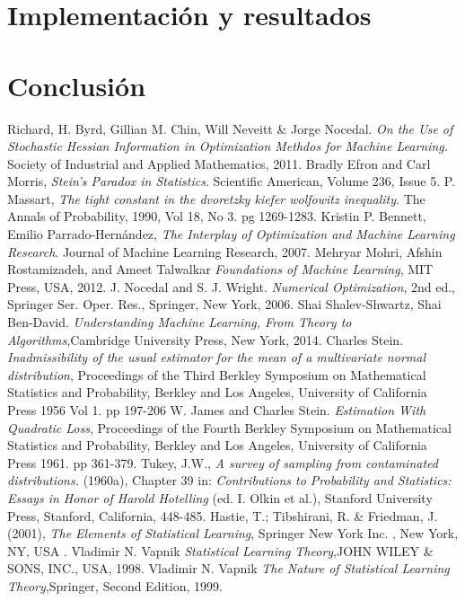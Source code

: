 \documentclass{book}
\theoremstyle{plain}
\theoremstyle{definition}
\theoremstyle{remark}
\begin{document}
\chapter{Implementación y resultados}

\chapter{Conclusión}


\begin{thebibliography}{9}
 Richard, H. Byrd, Gillian M. Chin, Will Neveitt \& Jorge Nocedal.
  \emph{On the Use of Stochastic Hessian Information in Optimization Methdos for Machine Learning.} Society of Industrial and Applied Mathematics, 2011.
 Bradly Efron and Carl Morris, \emph{Stein's Paradox in Statistics}. Scientific American, Volume 236, Issue 5.
 P. Massart, \emph{The tight constant in the dvoretzky kiefer wolfowitz inequality}. The Annals of Probability, 1990, Vol 18, No 3. pg 1269-1283. 
 Kristin P. Bennett, Emilio Parrado-Hernández, \emph{The Interplay of Optimization and Machine Learning Research}. Journal of Machine Learning Research, 2007.
 Mehryar Mohri, Afshin Rostamizadeh, and Ameet Talwalkar
  \emph{Foundations of Machine Learning}, MIT Press, USA, 2012.
 J. Nocedal and S. J. Wright. \emph{Numerical Optimization}, 2nd ed., Springer Ser. Oper. Res., Springer, New York, 2006.
 Shai Shalev-Shwartz, Shai Ben-David. \emph{Understanding Machine Learning, From Theory to Algorithms},Cambridge University Press, New York, 2014.
 Charles Stein. \emph{Inadmissibility of the usual estimator for the mean of a multivariate normal distribution}, Proceedings of the Third Berkley Symposium on Mathematical Statistics and Probability, Berkley and Los Angeles, University of California Press 1956 Vol 1. pp 197-206
 W. James and Charles Stein. \emph{Estimation With Quadratic Loss},  Proceedings of the Fourth Berkley Symposium on Mathematical Statistics and Probability, Berkley and Los Angeles, University of California Press 1961. pp 361-379.
 Tukey, J.W., \emph{A survey of sampling from contaminated distributions.} (1960a), Chapter 39 in: \emph{Contributions to Probability and Statistics: Essays in Honor of Harold Hotelling} (ed. I. Olkin et al.), Stanford University Press, Stanford, California, 448-485.
 Hastie, T.; Tibshirani, R. \& Friedman, J. (2001), \emph{The Elements of Statistical Learning}, Springer New York Inc. , New York, NY, USA .
 Vladimir N. Vapnik  \emph{Statistical Learning Theory},JOHN WILEY \& SONS, INC., USA, 1998.
 Vladimir N. Vapnik  \emph{The Nature of Statistical Learning Theory},Springer, Second Edition, 1999.

\end{thebibliography}
\end{document}
